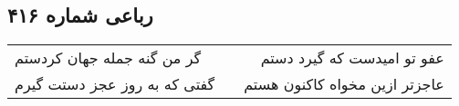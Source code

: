 \begin{center}
\section*{رباعی شماره ۴۱۶}
\label{sec:sh416}
\begin{longtable}{l p{0.5cm} r}
گر من گنه جمله جهان کردستم
&&
عفو تو امیدست که گیرد دستم
\\
گفتی که به روز عجز دستت گیرم
&&
عاجزتر ازین مخواه کاکنون هستم
\\
\end{longtable}
\end{center}
